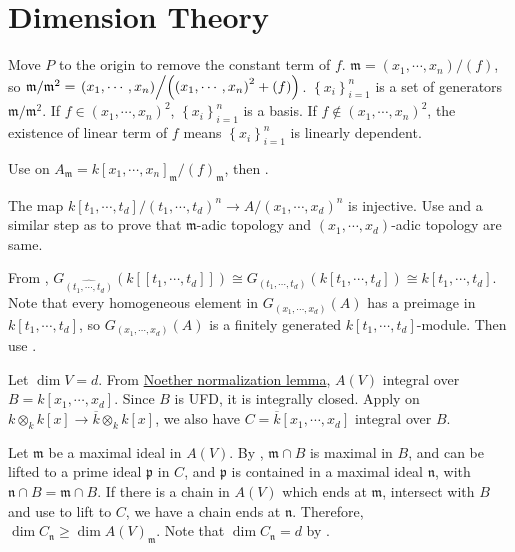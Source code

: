 \section{Dimension Theory}

\begin{exercise}\label{ex11.1}
	Move $P$ to the origin to remove the constant term of $f$. $\mathfrak{m}=\left(x_1,\cdots,x_n\right)/(f)$, so $\mathfrak{m}/\mathfrak{m}^2=\left.\left(x_1,\cdots,x_n\right)\middle/\left(\left(x_1,\cdots,x_n\right)^2+(f)\right)\right.$. $\left\{x_i\right\}_{i=1}^n$ is a set of generators $\mathfrak{m}/\mathfrak{m}^2$. If $f\in\left(x_1,\cdots,x_n\right)^2$, $\left\{x_i\right\}_{i=1}^n$ is a basis. If $f\notin\left(x_1,\cdots,x_n\right)^2$, the existence of linear term of $f$ means $\left\{x_i\right\}_{i=1}^n$ is linearly dependent.
	
	Use  on $A_\mathfrak{m}=k\left[x_1,\cdots,x_n\right]_\mathfrak{m}/(f)_\mathfrak{m}$, then .
\end{exercise}

\begin{exercise}\label{ex11.2}
	The map $k[t_1,\cdots,t_d]/\left(t_1,\cdots,t_d\right)^n\rightarrow A/\left(x_1,\cdots,x_d\right)^n$ is injective. Use  and a similar step as  to prove that $\mathfrak{m}$-adic topology and $\left(x_1,\cdots,x_d\right)$-adic topology are same.
	
	From , $G_{\widehat{\left(t_1,\cdots,t_d\right)}}\left(k\left[\left[t_1,\cdots,t_d\right]\right]\right)\cong G_{\left(t_1,\cdots,t_d\right)}\left(k\left[t_1,\cdots,t_d\right]\right)\cong k\left[t_1,\cdots,t_d\right]$. Note that every homogeneous element in $G_{\left(x_1,\cdots,x_d\right)}(A)$ has a preimage in $k\left[t_1,\cdots,t_d\right]$, so $G_{\left(x_1,\cdots,x_d\right)}(A)$ is a finitely generated $k\left[t_1,\cdots,t_d\right]$-module. Then use .
\end{exercise}

\begin{exercise}\label{ex11.3}
	Let $\dim V=d$. From \hyperref[noethernormalization]{Noether normalization lemma}, $A(V)$ integral over $B=k\left[x_1,\cdots,x_d\right]$. Since $B$ is UFD, it is integrally closed. Apply  on $k\otimes_kk[x]\rightarrow\overline{k}\otimes_kk[x]$, we also have $C=\overline{k}\left[x_1,\cdots,x_d\right]$ integral over $B$.
	
	Let $\mathfrak{m}$ be a maximal ideal in $A(V)$. By , $\mathfrak{m}\cap B$ is maximal in $B$, and can be lifted to a prime ideal $\mathfrak{p}$ in $C$, and $\mathfrak{p}$ is contained in a maximal ideal $\mathfrak{n}$, with $\mathfrak{n}\cap B=\mathfrak{m}\cap B$. If there is a chain in $A(V)$ which ends at $\mathfrak{m}$, intersect with $B$ and use  to lift to $C$, we have a chain ends at $\mathfrak{n}$. Therefore, $\dim C_\mathfrak{n}\geqslant\dim A(V)_\mathfrak{m}$. Note that $\dim C_\mathfrak{n}=d$ by .
\end{exercise}

